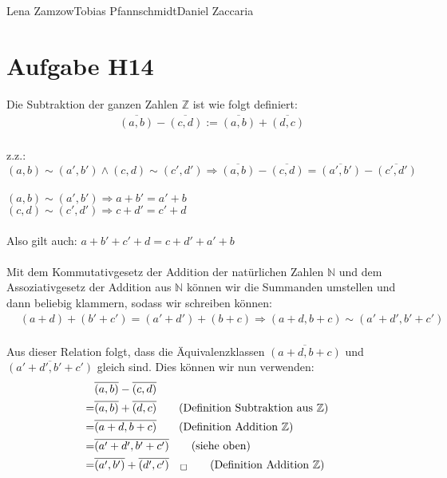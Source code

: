 \documentclass[11pt,a4paper]{article}
\begin{document}
                {Lena Zamzow}{Tobias Pfannschmidt}{Daniel Zaccaria}{}{}


\section*{Aufgabe H14}
Die Subtraktion der ganzen Zahlen $\mathbb{Z}$ ist wie folgt definiert: \\
\begin{align*}
&\overline{(a,b)} - \overline{(c,d)} := \overline{(a,b)} + \overline{(d,c)} \\
\end{align*}


z.z.: 
$ (a,b) \sim (a',b') \land (c, d) \sim (c',d') \Rightarrow \overline{(a,b)} - \overline{(c,d)} = \overline{(a',b')} - \overline{(c',d')}$ \\
\\
$(a,b) \sim (a',b') \Rightarrow a + b' = a' + b$ \\
$(c,d) \sim (c',d') \Rightarrow c + d' = c' + d$ \\
\\
Also gilt auch: 
$ a + b' + c' + d = c + d' + a' + b$ \\
\\
Mit dem Kommutativgesetz der Addition der natürlichen Zahlen $\mathbb{N}$ und dem Assoziativgesetz der Addition aus $\mathbb{N}$ können wir die Summanden umstellen und dann beliebig klammern, sodass wir schreiben können: \\
\begin{align*}
&(a+d) + (b'+c') = (a'+d') + (b+c) \Rightarrow (a+d, b+c) \sim (a'+d', b'+c') \\
\end{align*}

Aus dieser Relation folgt, dass die Äquivalenzklassen $\overline{(a+d,b+c)}$ und $\overline{(a'+d',b'+c')}$ gleich sind. Dies können wir nun verwenden: \\
\begin{align*}
&\overline{(a,b)} - \overline{(c,d)} \\
=& \overline{(a,b)} + \overline{(d,c)}   \tag{Definition Subtraktion aus $\mathbb{Z}$} \\
=& \overline{(a+d,b+c)}   \tag{Definition Addition $\mathbb{Z}$}\\
=& \overline{(a'+d',b'+c')}   \tag{siehe oben} \\
=& \overline{(a',b')} + \overline{(d',c')} ~~~ _\Box  \tag{Definition Addition $\mathbb{Z}$}
\end{align*}
\end{document}

